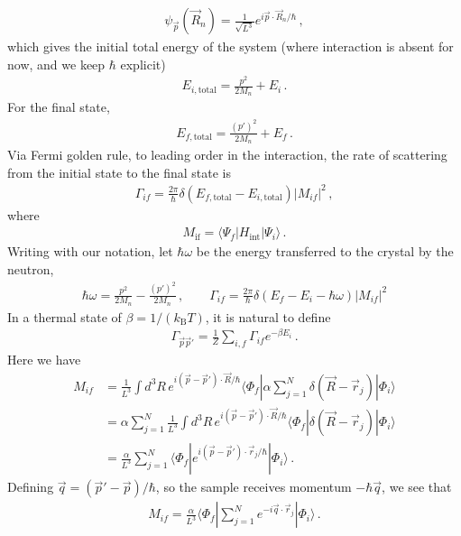 \documentclass[11pt, oneside]{book}
\theoremstyle{break}
\theoremstyle{break}
\begin{document}
\begin{align*}
\psi_{\vec{p}}(\vec{R}_n) = \frac{1}{\sqrt{L^3}} e^{i\vec{p}\cdot \vec{R}_n/\hbar}\,,
\end{align*}
which gives the initial total energy of the system (where interaction is absent for now, and we keep $\hbar$ explicit) 
\begin{align*}
E_{i,\text{total}} = \frac{p^2}{2M_n} + E_i\,.
\end{align*}
For the final state, 
\begin{align*}
E_{f,\text{total}} = \frac{(p')^2}{2M_n} + E_f\,.
\end{align*}
Via Fermi golden rule, to leading order in the interaction, the rate of scattering from the initial state to the final state is 
\begin{align*}
\Gamma_{if} = \frac{2\pi}{\hbar} \delta(E_{f,\text{total}} - E_{i,\text{total}}) | M_{if}|^2\,,
\end{align*}
where 
\begin{align*}
M_{\text{if}} = \langle \Psi_f | H_{\text{int}} | \Psi_i\rangle\,.
\end{align*}
Writing with our notation, let $\hbar\omega$ be the energy transferred to the crystal by the neutron, 
\begin{align*}
\hbar \omega = \frac{p^2}{2M_n} - \frac{(p')^2}{2M_n}\,,\qquad
\Gamma_{if} = \frac{2\pi}{\hbar}\delta(E_f - E_i - \hbar \omega) |M_{if}|^2
\end{align*}
In a thermal state of $\beta=1/(k_\text{B} T)$, it is natural to define
\begin{align*}
\Gamma_{\vec{p} \vec{p}'} = \frac{1}{Z}\sum_{i,f}\Gamma_{if} e^{-\beta E_i}\,.
\end{align*}
Here we have
\begin{align*}
M_{if} 
&= \frac{1}{L^3} \int d^3R\, e^{i(\vec{p}-\vec{p}')\cdot \vec{R}/\hbar} \langle \Phi_f | \alpha \sum_{j=1}^N \delta(\vec{R} - \vec{r}_j) |\Phi_i\rangle\\
&= \alpha\sum_{j=1}^N \frac{1}{L^3} \int d^3R\, e^{i(\vec{p}-\vec{p}')\cdot \vec{R}/\hbar} \langle \Phi_f | \delta(\vec{R} - {\vec{r}}_j)| \Phi_i\rangle\\
&= \frac{\alpha}{L^3}\sum_{j=1}^N \langle \Phi_f | e^{i(\vec{p} - \vec{p}')\cdot \vec{r}_j/\hbar}| \Phi_i\rangle\,.
\end{align*}
Defining $\vec{q} = (\vec{p}' - \vec{p})/\hbar$, so the sample receives momentum $-\hbar\vec{q}$, we see that 
\begin{align*}
M_{if} = \frac{\alpha}{L^3} \langle \Phi_f | \sum_{j=1}^N e^{-i\vec{q}\cdot \vec{r}_j} | \Phi_i\rangle\,.
\end{align*}
\end{document}
